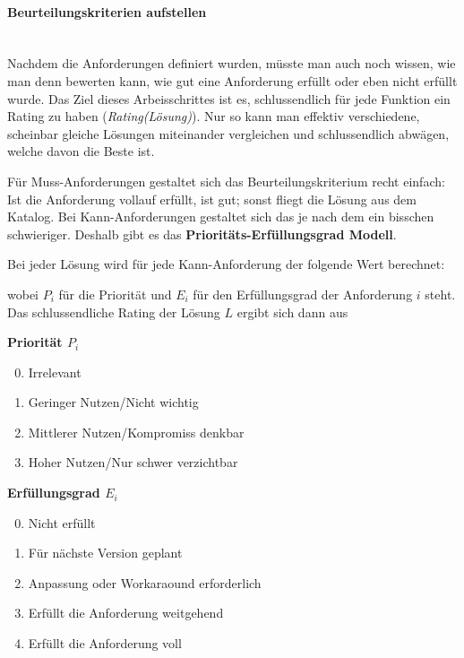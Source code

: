 \documentclass[a4paper, 11pt]{article}
\begin{document}
\paragraph{Beurteilungskriterien aufstellen}\mbox{}\\
Nachdem die Anforderungen definiert wurden, müsste man auch noch wissen, wie man denn bewerten kann, wie gut eine Anforderung erfüllt oder eben nicht erfüllt wurde. Das Ziel dieses Arbeisschrittes ist es, schlussendlich für jede Funktion ein Rating zu haben (\textit{Rating(Lösung)}). Nur so kann man effektiv verschiedene, scheinbar gleiche Lösungen miteinander vergleichen und schlussendlich abwägen, welche davon die Beste ist.

\vspace{10px}

\noindent Für Muss-Anforderungen gestaltet sich das Beurteilungskriterium recht einfach: Ist die Anforderung vollauf erfüllt, ist gut; sonst fliegt die Lösung aus dem Katalog. Bei Kann-Anforderungen gestaltet sich das je nach dem ein bisschen schwieriger. Deshalb gibt es das \textbf{Prioritäts-Erfüllungsgrad Modell}. 

\vspace{10px}

\noindent Bei jeder Lösung wird für jede Kann-Anforderung der folgende Wert berechnet:
\begin{center}
\end{center}

\noindent wobei $P_{i}$ für die Priorität und $E_{i}$ für den Erfüllungsgrad der Anforderung $i$ steht. Das schlussendliche Rating der Lösung $L$ ergibt sich dann aus 

\begin{center}
\end{center}

\begin{multicols}{2}
	\textbf{Priorität $P_{i}$} 
	\begin{enumerate} \setcounter{enumi}{-1}
		\item Irrelevant
		\item Geringer Nutzen/Nicht wichtig
		\item Mittlerer Nutzen/Kompromiss denkbar
		\item Hoher Nutzen/Nur schwer verzichtbar
	\end{enumerate}
	
	\columnbreak
	
	\textbf{Erfüllungsgrad $E_{i}$}
	\begin{enumerate} \setcounter{enumi}{-1}
		\item Nicht erfüllt
		\item Für nächste Version geplant
		\item Anpassung oder Workaraound erforderlich
		\item Erfüllt die Anforderung weitgehend
		\item Erfüllt die Anforderung voll
	\end{enumerate}
\end{multicols}
\end{document}
